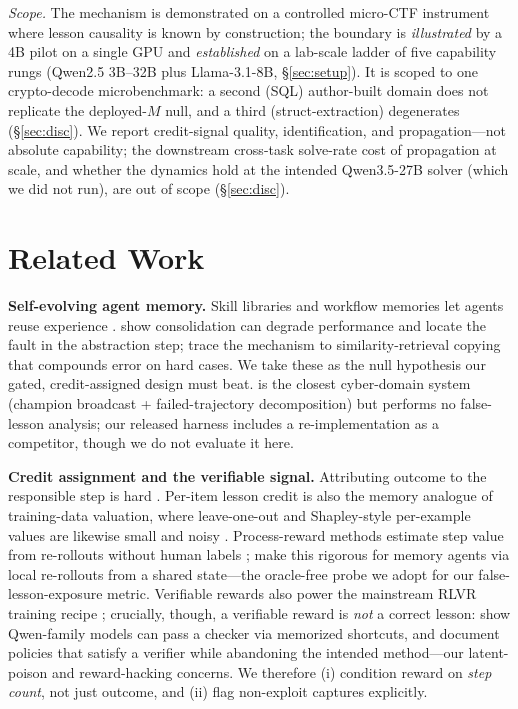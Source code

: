 \documentclass[10pt,twocolumn]{article}
\begin{document}
\noindent\emph{Scope.} The mechanism is demonstrated on a controlled micro-CTF instrument
where lesson causality is known by construction; the boundary is \emph{illustrated} by a 4B
pilot on a single GPU and \emph{established} on a lab-scale ladder of five capability rungs
(Qwen2.5 3B--32B plus Llama-3.1-8B, \S\ref{sec:setup}). It is scoped to one crypto-decode
microbenchmark: a second (SQL) author-built domain does not replicate the deployed-$M$
null, and a third (struct-extraction) degenerates (\S\ref{sec:disc}). We report credit-signal quality,
identification, and propagation---not absolute capability; the downstream cross-task
solve-rate cost of propagation at scale, and whether the dynamics hold at the intended
Qwen3.5-27B solver (which we did not run), are out of scope (\S\ref{sec:disc}).

\section{Related Work}
\textbf{Self-evolving agent memory.} Skill libraries and workflow memories let
agents reuse experience \citep{Reflexion,Voyager,AWM,ExpeL,AMEM,SkillGraph,EvolveR,FORGE}.
\citet{FaultyMemory} show consolidation can degrade performance and locate the
fault in the abstraction step; \citet{ExperienceFollowing} trace the mechanism to
similarity-retrieval copying that compounds error on hard cases. We take these as
the null hypothesis our gated, credit-assigned design must beat. \citet{FORGE} is the closest
cyber-domain system (champion broadcast + failed-trajectory decomposition) but
performs no false-lesson analysis; our released harness includes a re-implementation
as a competitor, though we do not evaluate it here.

\textbf{Credit assignment and the verifiable signal.} Attributing outcome to the
responsible step is hard \citep{WhoAndWhen,CreditAssignmentSurvey,SegmentCredit,GraphCreditAssignment}.
Per-item lesson credit is also the memory analogue of training-data valuation, where
leave-one-out and Shapley-style per-example values are likewise small and noisy
\citep{InfluenceFunctions,DataShapley}.
Process-reward methods estimate step value from re-rollouts without human labels
\citep{MathShepherd}; \citet{MemoryR2} make this rigorous for memory agents via
local re-rollouts from a shared state---the oracle-free probe we adopt for our
false-lesson-exposure metric. Verifiable rewards also power the mainstream RLVR
training recipe \citep{Tulu3,DeepSeekR1}; crucially, though, a verifiable reward is \emph{not} a
correct lesson: \citet{SpuriousRewards} show Qwen-family models can pass a checker
via memorized shortcuts, and \citet{LLMsGamingVerifiers} document policies that
satisfy a verifier while abandoning the intended method---our latent-poison and
reward-hacking concerns. We therefore (i) condition reward on \emph{step count},
not just outcome, and (ii) flag non-exploit captures explicitly.
\end{document}
